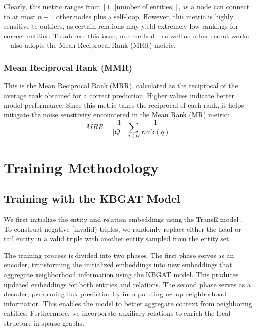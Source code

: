 Clearly, this metric ranges from \([1,~|\text{number of entities}|]\), as a node can connect to at most \(n-1\) other nodes plus a self-loop. However, this metric is highly sensitive to outliers, as certain relations may yield extremely low rankings for correct entities. To address this issue, our method—as well as other recent works—also adopts the Mean Reciprocal Rank (MRR) metric.


\subsubsection{Mean Reciprocal Rank (MMR)}
This is the Mean Reciprocal Rank (MRR), calculated as the reciprocal of the average rank obtained for a correct prediction. Higher values indicate better model performance. Since this metric takes the reciprocal of each rank, it helps mitigate the noise sensitivity encountered in the Mean Rank (MR) metric:
\[
MRR =\frac{1}{\mid Q \mid} \sum_{q \in Q} \frac{1}{\text{rank}(q)}
\]

\section{Training Methodology}


\subsection{Training with the KBGAT Model}

We first initialize the entity and relation embeddings using the TransE model \cite{bordes2013translating}. To construct negative (invalid) triples, we randomly replace either the head or tail entity in a valid triple with another entity sampled from the entity set.

The training process is divided into two phases. The first phase serves as an encoder, transforming the initialized embeddings into new embeddings that aggregate neighborhood information using the KBGAT model. This produces updated embeddings for both entities and relations. The second phase serves as a decoder, performing link prediction by incorporating $n$-hop neighborhood information. This enables the model to better aggregate context from neighboring entities. Furthermore, we incorporate auxiliary relations to enrich the local structure in sparse graphs.

